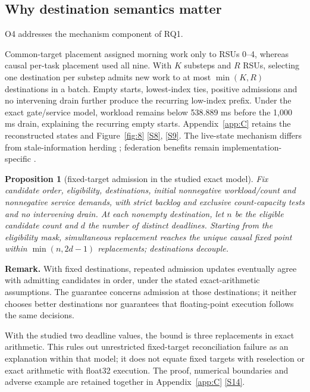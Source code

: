 \documentclass[12pt,a4paper]{article}
\newtheorem{proposition}{Proposition}
\begin{document}
\FloatBarrier
\subsection{Why destination semantics matter}\label{sec:3.5}

O4 addresses the mechanism component of RQ1.

Common-target placement assigned morning work only to RSUs 0--4, whereas causal per-task placement used all nine. With $K$ substeps and $R$ RSUs, selecting one destination per substep admits new work to at most $\min(K,R)$ destinations in a batch. Empty starts, lowest-index ties, positive admissions and no intervening drain further produce the recurring low-index prefix. Under the exact gate/service model, workload remains below 538.889 ms before the 1,000 ms drain, explaining the recurring empty starts. Appendix~\ref{app:C} retains the reconstructed states and Figure~\ref{fig:8} \hyperref[source-s8]{[S8]}, \hyperref[source-s9]{[S9]}. The live-state mechanism differs from stale-information herding \cite{ref45}; federation benefits remain implementation-specific \cite{ref46}.

\begin{proposition}[fixed-target admission in the studied exact model]\label{prop:1}
Fix candidate order, eligibility, destinations, initial nonnegative workload/count and nonnegative service demands, with strict backlog and exclusive count-capacity tests and no intervening drain. At each nonempty destination, let $n$ be the eligible candidate count and $d$ the number of distinct deadlines. Starting from the eligibility mask, simultaneous replacement reaches the unique causal fixed point within $\min(n,2d-1)$ replacements; destinations decouple.\end{proposition}

\textbf{Remark.} With fixed destinations, repeated admission updates eventually agree with admitting candidates in order, under the stated exact-arithmetic assumptions. The guarantee concerns admission at those destinations; it neither chooses better destinations nor guarantees that floating-point execution follows the same decisions.

With the studied two deadline values, the bound is three replacements in exact arithmetic. This rules out unrestricted fixed-target reconciliation failure as an explanation within that model; it does not equate fixed targets with reselection or exact arithmetic with float32 execution. The proof, numerical boundaries and adverse example are retained together in Appendix~\ref{app:C} \hyperref[source-s14]{[S14]}.
\end{document}
